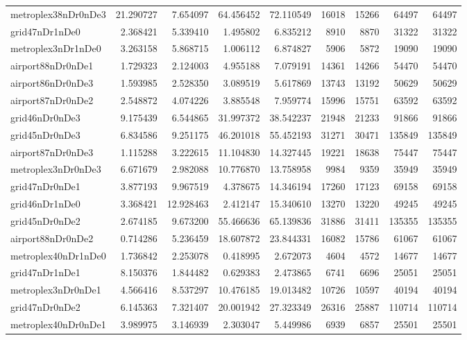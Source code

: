 \begin{longtable}{|l|r|r|r|r|r|r|r|r|}
metroplex38nDr0nDe3 & 21.290727 & 7.654097 & 64.456452 & 72.110549 & 16018 & 15266 & 64497 & 64497 \\
grid47nDr1nDe0 & 2.368421 & 5.339410 & 1.495802 & 6.835212 & 8910 & 8870 & 31322 & 31322 \\
metroplex3nDr1nDe0 & 3.263158 & 5.868715 & 1.006112 & 6.874827 & 5906 & 5872 & 19090 & 19090 \\
airport88nDr0nDe1 & 1.729323 & 2.124003 & 4.955188 & 7.079191 & 14361 & 14266 & 54470 & 54470 \\
airport86nDr0nDe3 & 1.593985 & 2.528350 & 3.089519 & 5.617869 & 13743 & 13192 & 50629 & 50629 \\
airport87nDr0nDe2 & 2.548872 & 4.074226 & 3.885548 & 7.959774 & 15996 & 15751 & 63592 & 63592 \\
grid46nDr0nDe3 & 9.175439 & 6.544865 & 31.997372 & 38.542237 & 21948 & 21233 & 91866 & 91866 \\
grid45nDr0nDe3 & 6.834586 & 9.251175 & 46.201018 & 55.452193 & 31271 & 30471 & 135849 & 135849 \\
airport87nDr0nDe3 & 1.115288 & 3.222615 & 11.104830 & 14.327445 & 19221 & 18638 & 75447 & 75447 \\
metroplex3nDr0nDe3 & 6.671679 & 2.982088 & 10.776870 & 13.758958 & 9984 & 9359 & 35949 & 35949 \\
grid47nDr0nDe1 & 3.877193 & 9.967519 & 4.378675 & 14.346194 & 17260 & 17123 & 69158 & 69158 \\
grid46nDr1nDe0 & 3.368421 & 12.928463 & 2.412147 & 15.340610 & 13270 & 13220 & 49245 & 49245 \\
grid45nDr0nDe2 & 2.674185 & 9.673200 & 55.466636 & 65.139836 & 31886 & 31411 & 135355 & 135355 \\
airport88nDr0nDe2 & 0.714286 & 5.236459 & 18.607872 & 23.844331 & 16082 & 15786 & 61067 & 61067 \\
metroplex40nDr1nDe0 & 1.736842 & 2.253078 & 0.418995 & 2.672073 & 4604 & 4572 & 14677 & 14677 \\
grid47nDr1nDe1 & 8.150376 & 1.844482 & 0.629383 & 2.473865 & 6741 & 6696 & 25051 & 25051 \\
metroplex3nDr0nDe1 & 4.566416 & 8.537297 & 10.476185 & 19.013482 & 10726 & 10597 & 40194 & 40194 \\
grid47nDr0nDe2 & 6.145363 & 7.321407 & 20.001942 & 27.323349 & 26316 & 25887 & 110714 & 110714 \\
metroplex40nDr0nDe1 & 3.989975 & 3.146939 & 2.303047 & 5.449986 & 6939 & 6857 & 25501 & 25501 \\

\end{longtable}
